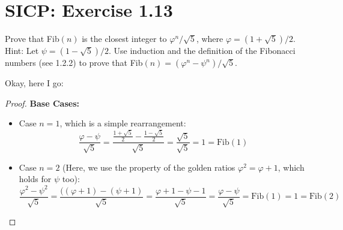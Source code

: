 \documentclass[12pt,a4paper]{article}
\newcommand{\Fib}{\mathrm{Fib}}
\begin{document}
\section*{SICP: Exercise 1.13}
\begin{displayquote}
	Prove that Fib$(n)$ is the closest integer to
	$\varphi^n / \sqrt{5}$, where $\varphi = (1 + \sqrt{5})/2$.
	Hint: Let $\psi = (1 - \sqrt{5})/2$.
	Use induction and the definition of the Fibonacci numbers (see 1.2.2) to prove that Fib$(n) = (\varphi^n - \psi^n)/\sqrt{5}$.
\end{displayquote}

Okay, here I go:

\begin{proof}
	\textbf{Base Cases:}
	\begin{itemize}
		\item Case ${n = 1}$, which is a simple rearrangement:
		      \[
			      \frac{\varphi - \psi}{\sqrt{5}} = \frac{\frac{1 + \sqrt{5}}{2} - \frac{1 - \sqrt{5}}{2}}{\sqrt{5}} = \frac{\sqrt{5}}{\sqrt{5}} = 1 = \Fib(1)
		      \]
		\item Case ${n = 2}$ (Here, we use the property of the golden ratios $\varphi^2 = \varphi + 1$, which holds for $\psi$ too):
		      \[
			      \frac{\varphi^2 - \psi^2}{\sqrt{5}} = \frac{((\varphi + 1) - (\psi + 1)}{\sqrt{5}} = \frac{\varphi + 1 - \psi - 1}{\sqrt{5}} = \frac{\varphi - \psi}{\sqrt{5}} = \Fib(1) = 1 = \Fib(2)
		      \]
	\end{itemize}


\end{proof}
\end{document}
